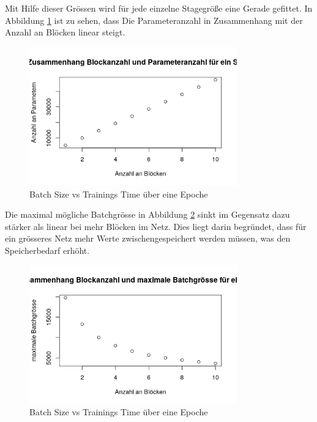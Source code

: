 Mit Hilfe dieser Grössen wird für jede einzelne Stagegröße eine Gerade gefittet.
In Abbildung \ref{fig:linearBlocks} ist zu sehen, dass Die Parameteranzahl in Zusammenhang mit der Anzahl an Blöcken linear steigt.


\begin{figure}[h]
 \centering
 \includegraphics[width=0.8\textwidth]{KapitelPartB/Images/linearBlocks.png}
 \caption{Batch Size vs Trainings Time über eine Epoche}
 \label{fig:linearBlocks}
\end{figure}




Die maximal mögliche Batchgrösse in Abbildung \ref{fig:maxBatchSize} sinkt im Gegensatz dazu stärker als linear bei mehr Blöcken im Netz. Dies liegt darin begründet, dass für ein grösseres Netz mehr Werte zwischengespeichert werden müssen, was den Speicherbedarf erhöht.

\begin{figure}[h]
 \centering
 \includegraphics[width=0.8\textwidth]{KapitelPartB/Images/maxBatchSize.png}
 \caption{Batch Size vs Trainings Time über eine Epoche}
 \label{fig:maxBatchSize}
\end{figure}




